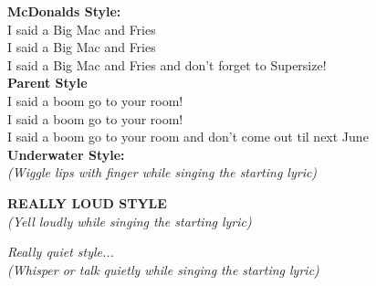 \textbf{McDonalds Style:} \\
I said a Big Mac and Fries \\
I said a Big Mac and Fries \\
I said a Big Mac and Fries and don't forget to Supersize! \\

\textbf{Parent Style} \\
I said a boom go to your room! \\
I said a boom go to your room! \\
I said a boom go to your room and don't come out til next June \\

\textbf{Underwater Style:} \\
\textit{(Wiggle lips with finger while singing the starting lyric)}

\textbf{REALLY LOUD STYLE} \\
\textit{(Yell loudly while singing the starting lyric)}

\textit{Really quiet style...} \\
\textit{(Whisper or talk quietly while singing the starting lyric)}
